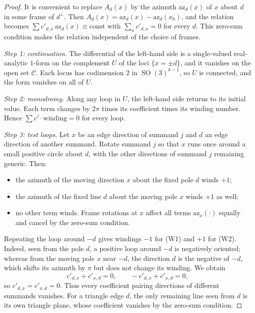 \documentclass[11pt]{amsart}
\theoremstyle{definition}
\DeclareMathOperator{\SO}{SO}
\begin{document}
\begin{proof}
It is convenient to replace $A_d(x)$ by the azimuth $\mathrm{az}_d(x)$ of $x$ about $d$ in some frame of $d^\perp$.
Then $A_d(x)=\mathrm{az}_d(x)-\mathrm{az}_d(x_0)$, and the relation becomes $\sum c'_{d,x}\,\mathrm{az}_d(x)\equiv
\mathrm{const}$ with $\sum_xc'_{d,x}=0$ for every $d$. This zero-sum condition makes the relation independent of the
choice of frames.

\emph{Step 1: continuation.} The differential of the left-hand side is a single-valued real-analytic $1$-form on the
complement $U$ of the loci $\{x=\pm d\}$, and it vanishes on the open set $\mathcal C$. Each locus has codimension
$2$ in $\SO(3)^{k-1}$, so $U$ is connected, and the form vanishes on all of $U$.

\emph{Step 2: monodromy.} Along any loop in $U$, the left-hand side returns to its initial value. Each term changes by
$2\pi$ times its coefficient times its winding number. Hence $\sum c'\cdot\mathrm{winding}=0$ for every loop.

\emph{Step 3: test loops.} Let $x$ be an edge direction of summand $j$ and $d$ an edge direction of another summand.
Rotate summand $j$ so that $x$ runs once around a small positive circle about $d$, with the other directions of
summand $j$ remaining generic. Then:
\begin{itemize}[leftmargin=3em]
\item[(W1)] the azimuth of the moving direction $x$ about the fixed pole $d$ winds $+1$;
\item[(W2)] the azimuth of the fixed line $d$ about the moving pole $x$ winds $+1$ as well;
\item no other term winds. Frame rotations at $x$ affect all terms $\mathrm{az}_x(\cdot)$ equally and cancel by the
zero-sum condition.
\end{itemize}
Repeating the loop around $-d$ gives windings $-1$ for (W1) and $+1$ for (W2). Indeed, seen from the pole $d$, a
positive loop around $-d$ is negatively oriented; whereas from the moving pole $x$ near $-d$, the direction $d$ is the
negative of $-d$, which shifts its azimuth by $\pi$ but does not change its winding. We obtain
\[
c'_{d,x}+c'_{x,d}=0,\qquad -c'_{d,x}+c'_{x,d}=0,
\]
so $c'_{d,x}=c'_{x,d}=0$. Thus every coefficient pairing directions of different summands vanishes. For a triangle
edge $d$, the only remaining line seen from $d$ is its own triangle plane, whose coefficient vanishes by the
zero-sum condition.
\end{proof}
\end{document}
